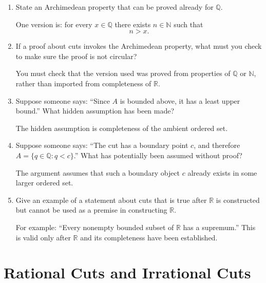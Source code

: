 \documentclass{essay}
\begin{document}
\begin{enumerate}[label=\arabic*., itemsep=10pt]
\item State an Archimedean property that can be proved already for $\mathbb{Q}$.

\begin{answer}
One version is:
for every $x\in\mathbb{Q}$ there exists $n\in\mathbb{N}$ such that
\[
n>x.
\]
\end{answer}

\item If a proof about cuts invokes the Archimedean property, what must you check to make sure the proof is not circular?

\begin{answer}
You must check that the version used was proved from properties of $\mathbb{Q}$ or $\mathbb{N}$, rather than imported from completeness of $\mathbb{R}$.
\end{answer}

\item Suppose someone says:
``Since $A$ is bounded above, it has a least upper bound.''
What hidden assumption has been made?

\begin{answer}
The hidden assumption is completeness of the ambient ordered set.
\end{answer}

\item Suppose someone says:
``The cut has a boundary point $c$, and therefore $A=\{q\in\mathbb{Q}:q<c\}$.''
What has potentially been assumed without proof?

\begin{answer}
The argument assumes that such a boundary object $c$ already exists in some larger ordered set.
\end{answer}

\item Give an example of a statement about cuts that is true after $\mathbb{R}$ is constructed but cannot be used as a premise in constructing $\mathbb{R}$.

\begin{answer}
For example: ``Every nonempty bounded subset of $\mathbb{R}$ has a supremum.'' This is valid only after $\mathbb{R}$ and its completeness have been established.
\end{answer}

\end{enumerate}

\section{Rational Cuts and Irrational Cuts}
\end{document}

